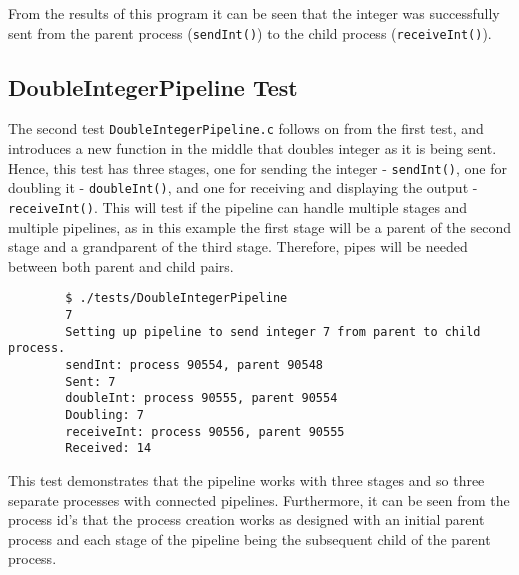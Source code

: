 \documentclass{article}
\begin{document}
    \noindent From the results of this program it can be seen that the integer was successfully sent from the parent process (\verb+sendInt()+) to the child process (\verb+receiveInt()+).
    
    \subsection{DoubleIntegerPipeline Test}
    The second test \verb+DoubleIntegerPipeline.c+ follows on from the first test, and introduces a new function in the middle that doubles integer as it is being sent.
    Hence, this test has three stages, one for sending the integer - \verb+sendInt()+, one for doubling it - \verb+doubleInt()+, and one for receiving and displaying the output - \verb+receiveInt()+.
    This will test if the pipeline can handle multiple stages and multiple pipelines, as in this example the first stage will be a parent of the second stage and a grandparent of the third stage.
    Therefore, pipes will be needed between both parent and child pairs.

        \begin{verbatim}
        $ ./tests/DoubleIntegerPipeline
        7
        Setting up pipeline to send integer 7 from parent to child process.
        sendInt: process 90554, parent 90548
        Sent: 7
        doubleInt: process 90555, parent 90554
        Doubling: 7
        receiveInt: process 90556, parent 90555
        Received: 14
        \end{verbatim}

    \noindent This test demonstrates that the pipeline works with three stages and so three separate processes with connected pipelines.
    Furthermore, it can be seen from the process id's that the process creation works as designed with an initial parent process and each stage of the pipeline being the subsequent child of the parent process.
    
\end{document}
